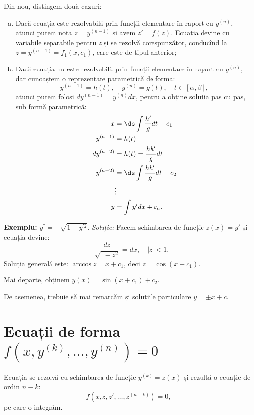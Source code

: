 Din nou, distingem două cazuri:
\begin{enumerate}[(a)]
  \item Dacă ecuația este rezolvabilă prin funcții elementare în raport cu $ y^{(n)} $,
    atunci putem nota $ z = y^{(n-1)} $ și avem $ z' = f(z) $. Ecuația devine cu
    variabile separabile pentru $ z $ și se rezolvă corespunzător, conducînd la
  $ z = y^{(n-1)} = f_1(x, c_1) $, care este de tipul anterior;
  \item Dacă ecuația nu este rezolvabilă prin funcții elementare în raport cu
    $ y^{(n)} $, dar cunoaștem o reprezentare parametrică de forma:
    \[
      y^{(n-1)} = h(t), \quad y^{(n)} = g(t), \quad t \in [\alpha, \beta],
    \]
    atunci putem folosi $ dy^{(n-1)} = y^{(n)} dx $, pentru a obține soluția
    pas cu pas, sub formă parametrică:
    \begin{align*}
      x &= \ds\int\frac{h'}{g} dt + c_1 \\
      y^{(n-1)} &= h(t) \\
      dy^{(n-2)} &= h(t) = \dfrac{hh'}{g} dt \\
      y^{(n-2)} &= \ds\int \frac{hh'}{g} dt + c_2 \\
                &\vdots \\
      y &= \int y' dx + c_n.
    \end{align*}

\end{enumerate}

\textbf{Exemplu:} $ y^{''} = - \sqrt{1 - y^{'2}} $.
\emph{Soluție:} Facem schimbarea de funcție $ z(x) = y' $ și ecuația devine:
\[
  - \dfrac{dz}{\sqrt{1 - z^2}} = dx, \quad |z| < 1.
\]
Soluția generală este: $ \arccos z = x + c_1 $, deci $ z = \cos(x + c_1) $.

Mai departe, obținem $ y(x) = \sin(x + c_1) + c_2 $.

De asemenea, trebuie să mai remarcăm și soluțiile particulare $ y = \pm x + c $.


\section{Ecuații de forma $ f(x, y^{(k)}, \dots, y^{(n)}) = 0 $}

Ecuația se rezolvă cu schimbarea de funcție $ y^{(k)} = z(x) $ și rezultă
o ecuație de ordin $ n - k $:
\[
  f(x, z, z', \dots, z^{(n-k)}) = 0,
\]
pe care o integrăm.

